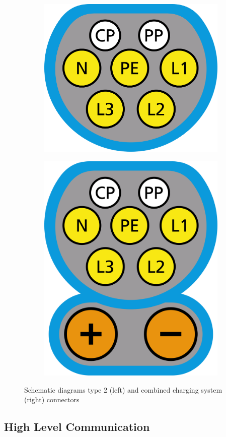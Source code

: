\documentclass[conference,flushend]{iaria} %
\begin{document}
\begin{figure}[ht]
    \centering
    \begin{subfigure}
        \centering
        \includegraphics[width=.2\textwidth]{graphs/type2.pdf}
        \label{fig:type2}
    \end{subfigure}
    \hfill
    \begin{subfigure}
        \centering
        \includegraphics[width=.2\textwidth]{graphs/ccs.pdf}
        \label{fig:ccs}
    \end{subfigure}
    \caption{Schematic diagrams type 2 (left) and combined charging system (right) connectors}
    \label{fig:connectors}
\end{figure}


\subsection{High Level Communication}

\end{document}

